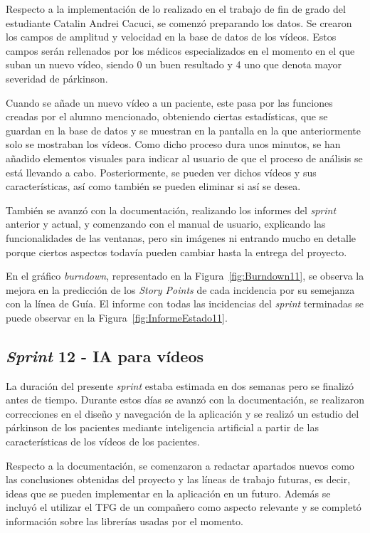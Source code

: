 Respecto a la implementación de lo realizado en el trabajo de fin de grado del estudiante Catalin Andrei Cacuci, se comenzó preparando los datos. Se crearon los campos de amplitud y velocidad en la base de datos de los vídeos. Estos campos serán rellenados por los médicos especializados en el momento en el que suban un nuevo vídeo, siendo 0 un buen resultado y 4 uno que denota mayor severidad de párkinson. 

Cuando se añade un nuevo vídeo a un paciente, este pasa por las funciones creadas por el alumno mencionado, obteniendo ciertas estadísticas, que se guardan en la base de datos y se muestran en la pantalla en la que anteriormente solo se mostraban los vídeos. Como dicho proceso dura unos minutos, se han añadido elementos visuales para indicar al usuario de que el proceso de análisis se está llevando a cabo. Posteriormente, se pueden ver dichos vídeos y sus características, así como también se pueden eliminar si así se desea.

También se avanzó con la documentación, realizando los informes del \textit{sprint} anterior y actual, y comenzando con el manual de usuario, explicando las funcionalidades de las ventanas, pero sin imágenes ni entrando mucho en detalle porque ciertos aspectos todavía pueden cambiar hasta la entrega del proyecto.

En el gráfico \textit{burndown}, representado en la Figura~\ref{fig:Burndown11}, se observa la mejora en la predicción de los \textit{Story Points} de cada incidencia por su semejanza con la línea de Guía. El informe con todas las incidencias del \textit{sprint} terminadas se puede observar en la Figura~\ref{fig:InformeEstado11}.




\subsection{\textit{Sprint} 12 - IA para vídeos}
La duración del presente \textit{sprint} estaba estimada en dos semanas pero se finalizó antes de tiempo. Durante estos días se avanzó con la documentación, se realizaron correcciones en el diseño y navegación de la aplicación y se realizó un estudio del párkinson de los pacientes mediante inteligencia artificial a partir de las características de los vídeos de los pacientes.

Respecto a la documentación, se comenzaron a redactar apartados nuevos como las conclusiones obtenidas del proyecto y las líneas de trabajo futuras, es decir, ideas que se pueden implementar en la aplicación en un futuro. Además se incluyó el utilizar el TFG de un compañero como aspecto relevante y se completó información sobre las librerías usadas por el momento.

